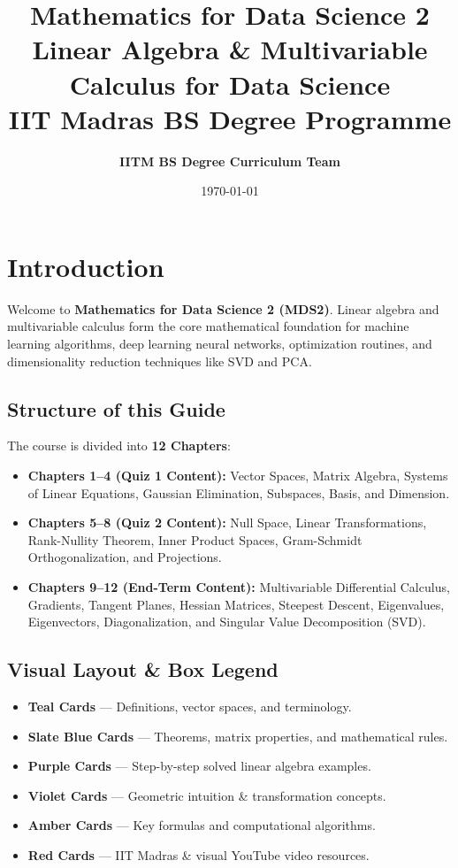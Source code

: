 \documentclass[11pt,a4paper,oneside]{book}
\title{
    \vspace{-2cm}
    \Huge\bfseries\sffamily Mathematics for Data Science 2 \\[0.5em]
    \Large\sffamily Linear Algebra \& Multivariable Calculus for Data Science \\[0.3em]
    \large\sffamily IIT Madras BS Degree Programme
}
\author{\textbf{IITM BS Degree Curriculum Team}}
\date{\today}
\begin{document}
\maketitle

\frontmatter
\tableofcontents
\newpage

\chapter*{Introduction}

Welcome to \textbf{Mathematics for Data Science 2 (MDS2)}. Linear algebra and multivariable calculus form the core mathematical foundation for machine learning algorithms, deep learning neural networks, optimization routines, and dimensionality reduction techniques like SVD and PCA.

\section*{Structure of this Guide}
The course is divided into \textbf{12 Chapters}:
\begin{itemize}
    \item \textbf{Chapters 1--4 (Quiz 1 Content):} Vector Spaces, Matrix Algebra, Systems of Linear Equations, Gaussian Elimination, Subspaces, Basis, and Dimension.
    \item \textbf{Chapters 5--8 (Quiz 2 Content):} Null Space, Linear Transformations, Rank-Nullity Theorem, Inner Product Spaces, Gram-Schmidt Orthogonalization, and Projections.
    \item \textbf{Chapters 9--12 (End-Term Content):} Multivariable Differential Calculus, Gradients, Tangent Planes, Hessian Matrices, Steepest Descent, Eigenvalues, Eigenvectors, Diagonalization, and Singular Value Decomposition (SVD).
\end{itemize}

\section*{Visual Layout \& Box Legend}
\begin{itemize}
    \item \textcolor{tealdef}{\textbf{Teal Cards}} --- Definitions, vector spaces, and terminology.
    \item \textcolor{primaryborder}{\textbf{Slate Blue Cards}} --- Theorems, matrix properties, and mathematical rules.
    \item \textcolor{purpleex}{\textbf{Purple Cards}} --- Step-by-step solved linear algebra examples.
    \item \textcolor{purpleex}{\textbf{Violet Cards}} --- Geometric intuition \& transformation concepts.
    \item \textcolor{coralformula}{\textbf{Amber Cards}} --- Key formulas and computational algorithms.
    \item \textcolor{yttext}{\textbf{Red Cards}} --- IIT Madras \& visual YouTube video resources.
\end{itemize}
\end{document}

